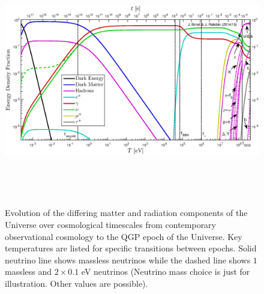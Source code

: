 \documentclass[universe,article,submit,moreauthors,pdftex,a4paper]{Definitions/mdpi}
\begin{document}
\begin{figure}
  \centerline{\hspace*{0.4cm}\includegraphics[height=11cm]{./plots/energy_fractions.eps}}
  \caption{Evolution of the differing matter and radiation components of the Universe over cosmological timescales from contemporary observational cosmology to the QGP epoch of the Universe. Key temperatures are listed for specific transitions between epochs. Solid neutrino line shows massless neutrinos while the dashed line shows $1$ massless and $2\times 0.1$ eV neutrinos (Neutrino mass choice is just for illustration.  Other values are possible). \label{CosmicFraction}}
\end{figure}
\end{document}
